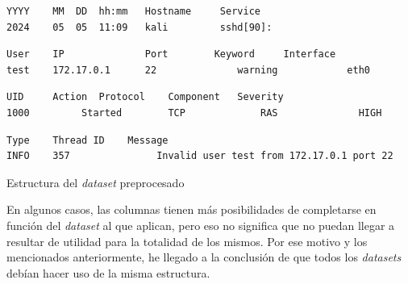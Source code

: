 \begin{table}[H]
    \footnotesize
    \centering
    \begin{center}
        \begin{mdframed}
        \footnotesize
            \begin{verbatim}
YYYY	MM	DD	hh:mm	Hostname     Service
2024	05	05	11:09	kali         sshd[90]: 
            \end{verbatim}
        \end{mdframed}
    \end{center}
    \begin{center}
        \begin{mdframed}
        \footnotesize
            \begin{verbatim}
User    IP              Port	    Keyword	    Interface	
test    172.17.0.1      22              warning            eth0    
            \end{verbatim}
        \end{mdframed}
    \end{center}
    \begin{center}
        \begin{mdframed}
        \footnotesize
            \begin{verbatim}
UID  	Action 	Protocol	Component	Severity
1000         Started        TCP             RAS              HIGH     
            \end{verbatim}
        \end{mdframed}
    \end{center}
    \begin{center}
        \begin{mdframed}
        \footnotesize
            \begin{verbatim}
Type    Thread ID	 Message	    
INFO    357               Invalid user test from 172.17.0.1 port 22
            \end{verbatim}
        \end{mdframed}
    \end{center}
    \label{tab:my_label}
    \caption{Estructura del \textit{dataset} preprocesado}
\end{table}

En algunos casos, las columnas tienen más posibilidades de completarse en función del \textit{dataset} al que aplican, pero eso no significa que no puedan llegar a resultar de utilidad para la totalidad de los mismos. Por ese motivo y los mencionados anteriormente, he llegado a la conclusión de que todos los \textit{datasets} debían hacer uso de la misma estructura.

